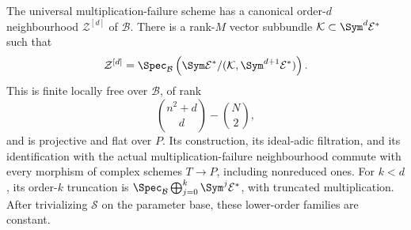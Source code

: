 \begin{theorem}
\label{thm:universal-finite-neighbourhood}
The universal multiplication-failure scheme has a canonical order-\(d\)
neighbourhood \(\mathcal Z^{[d]}\) of \(\mathcal B\).  There is a
rank-\(M\) vector subbundle
\(\mathcal K\subset\Sym^d\mathcal E^*\) such that
\begin{equation}\label{eq:universal-truncated-algebra}
 \mathcal Z^{[d]}=
 \Spec_{\mathcal B}\left(
 \Sym\mathcal E^*/
 (\mathcal K,\Sym^{d+1}\mathcal E^*)\right).
\end{equation}
This is finite locally free over \(\mathcal B\), of rank
\begin{equation}\label{eq:universal-finite-rank}
                   \binom{n^2+d}{d}-\binom N2,
\end{equation}
and is projective and flat over \(P\).  Its construction, its
ideal-adic filtration, and its identification with the actual
multiplication-failure neighbourhood commute with every morphism of
complex schemes \(T\to P\), including nonreduced ones.
For \(k<d\), its order-\(k\) truncation is
\(\Spec_{\mathcal B}\bigoplus_{j=0}^k\Sym^j\mathcal E^*\),
with truncated multiplication.  After trivializing \(\mathcal S\)
on the parameter base, these lower-order families are constant.
\end{theorem}
